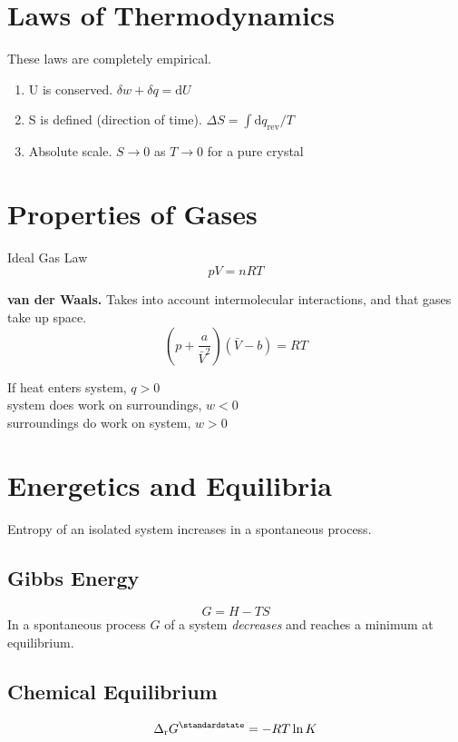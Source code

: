 \section{Laws of Thermodynamics}
These laws are completely empirical.

\begin{enumerate}
    \item U is conserved. $\delta w + \delta q = \mathrm{d}U$
    \item S is defined (direction of time). $ \Delta S = \int \mathrm{d}q_{\mathrm{rev}} / T$
    \item Absolute scale. $S \rightarrow 0$ as $T \rightarrow 0$ for a pure crystal
\end{enumerate}

\section{Properties of Gases}
Ideal Gas Law $$pV = nRT$$

\textbf{van der Waals.} Takes into account intermolecular interactions, and that gases take up space.
$$\left(p + \frac{a}{\bar{V}^2}\right) \left(\bar{V} - b\right) = RT$$ 

If heat enters system, $q > 0$\\
system does work on surroundings, $w < 0$\\
surroundings do work on system, $w > 0$

\section{Energetics and Equilibria}

Entropy of an isolated system increases in a spontaneous process.

\subsection*{Gibbs Energy}
\begin{equation*}
    G = H - TS
\end{equation*}
In a spontaneous process $G$ of a system \textit{decreases} and reaches a minimum at equilibrium.

\subsection*{Chemical Equilibrium}
\begin{equation*}
    \Delta_{\mathrm{r}}G^\standardstate = -RT \ln K
\end{equation*}

